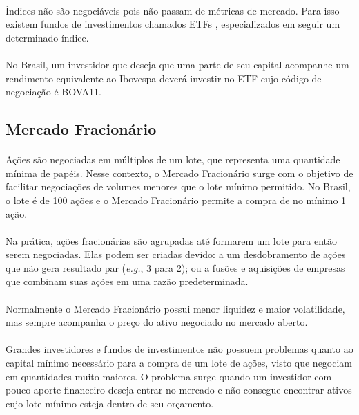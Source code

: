 \paragraph{} Índices não são negociáveis pois não passam de métricas de mercado. Para isso existem fundos de investimentos chamados ETFs \cite{etf}, especializados em seguir um determinado índice.

\paragraph{} No Brasil, um investidor que deseja que uma parte de seu capital acompanhe um rendimento equivalente ao Ibovespa deverá investir no ETF cujo código de negociação é BOVA11.



\FloatBarrier
\subsection{Mercado Fracionário}

\paragraph{} Ações são negociadas em múltiplos de um lote, que representa uma quantidade mínima de papéis. Nesse contexto, o Mercado Fracionário \cite{mercado_fracionario} surge com o objetivo de facilitar negociações de volumes menores que o lote mínimo permitido. No Brasil, o lote é de 100 ações e o Mercado Fracionário permite a compra de no mínimo 1 ação.

\paragraph{} Na prática, ações fracionárias são agrupadas até formarem um lote para então serem negociadas. Elas podem ser criadas devido: a um desdobramento de ações que não gera resultado par (\textit{e.g.}, 3 para 2); ou a fusões e aquisições de empresas que combinam suas ações em uma razão predeterminada.

\paragraph{} Normalmente o Mercado Fracionário possui menor liquidez e maior volatilidade, mas sempre acompanha o preço do ativo negociado no mercado aberto.

\paragraph{} Grandes investidores e fundos de investimentos não possuem problemas quanto ao capital mínimo necessário para a compra de um lote de ações, visto que negociam em quantidades muito maiores. O problema surge quando um investidor com pouco aporte financeiro deseja entrar no mercado e não consegue encontrar ativos cujo lote mínimo esteja dentro de seu orçamento.




